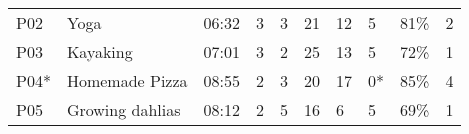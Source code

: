 \begin{table*}[t]
\begin{tabularx}{\textwidth}{p{0.5cm}p{3cm}p{1cm}p{1cm}p{1cm}p{1cm}p{1cm}p{1cm}p{1cm}p{1cm}}
P02         & Yoga                                                                   & 06:32                                                                    & 3                                                                      & 3                                                                   & 21                                                            & 12                                                                   & 5                                                                      & 81\%                                                                          & 2                                                                        \\
P03         & Kayaking                                                               & 07:01                                                                    & 3                                                                      & 2                                                                   & 25                                                            & 13                                                                   & 5                                                                      & 72\%                                                                          & 1                                                                        \\
P04*        & Homemade Pizza                                                         & 08:55                                                                    & 2                                                                      & 3                                                                   & 20                                                            & 17                                                                   & 0*                                                                      & 85\%                                                                          & 4                                                                        \\
P05         & Growing dahlias                                                        & 08:12                                                                    & 2                                                                      & 5                                                                   & 16                                                            & 6                                                                    & 5                                                                      & 69\%                                                                          & 1                                                                        \\

\end{tabularx}
\end{table*}
